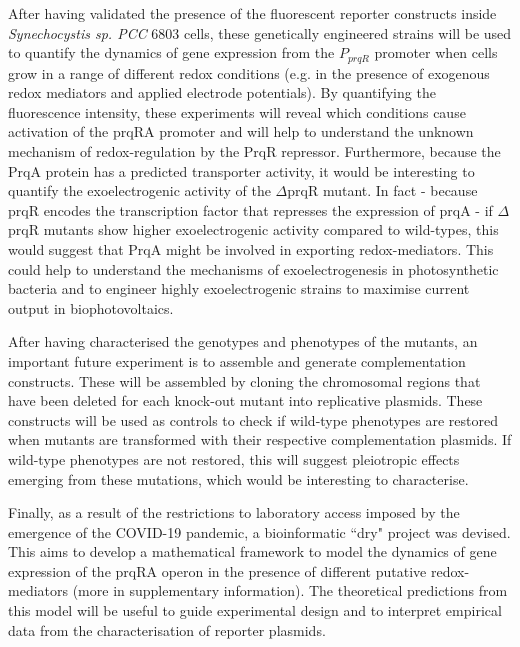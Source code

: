 After having validated the presence of the fluorescent reporter constructs inside \textit{Synechocystis sp. PCC} 6803 cells, these genetically engineered strains will be used to quantify the dynamics of gene expression from the $P_{prqR}$ promoter when cells grow in a range of different redox conditions (e.g. in the presence of exogenous redox mediators and applied electrode potentials). By quantifying the fluorescence intensity, these experiments will reveal which conditions cause activation of the prqRA promoter and will help to understand the unknown mechanism of redox-regulation by the PrqR repressor.
Furthermore, because the PrqA protein has a predicted transporter activity, it would be interesting to quantify the exoelectrogenic activity of the $\Delta$prqR mutant. In fact - because prqR encodes the transcription factor that represses the expression of prqA - if $\Delta$prqR mutants show higher exoelectrogenic activity compared to wild-types, this would suggest that PrqA might be involved in exporting redox-mediators. This could help to understand the mechanisms of exoelectrogenesis in photosynthetic bacteria and to engineer highly exoelectrogenic strains to maximise current output in biophotovoltaics.

After having characterised the genotypes and phenotypes of the mutants, an important future experiment is to assemble and generate complementation constructs. These will be assembled by cloning the chromosomal regions that have been deleted for each knock-out mutant into replicative plasmids. These constructs will be used as controls to check if wild-type phenotypes are restored when mutants are transformed with their respective complementation plasmids. If wild-type phenotypes are not restored, this will suggest pleiotropic effects emerging from these mutations, which would be interesting to characterise.

Finally, as a result of the restrictions to laboratory access imposed by the emergence of the COVID-19 pandemic, a bioinformatic ``dry" project was devised. This aims to develop a mathematical framework to model the dynamics of gene expression of the prqRA operon in the presence of different putative redox-mediators (more in supplementary information). The theoretical predictions from this model will be useful to guide experimental design and to interpret empirical data from the characterisation of reporter plasmids.


